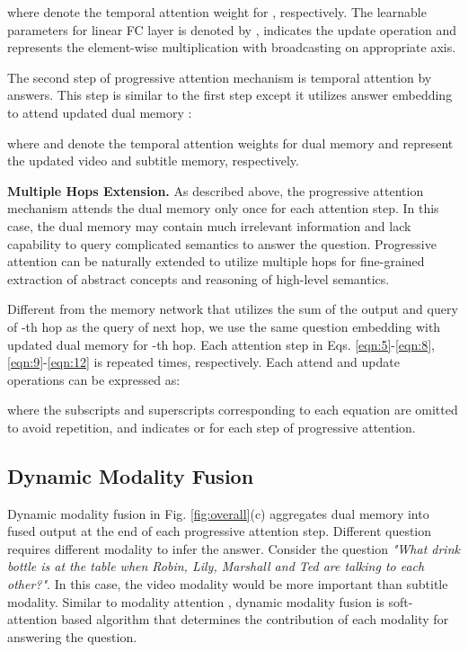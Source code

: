 \documentclass[10pt,twocolumn,letterpaper]{article}
\begin{document}
where  denote the temporal attention weight for , respectively. The learnable parameters for linear FC layer is denoted by  ,  indicates the update operation and  represents the element-wise multiplication with broadcasting on appropriate axis.


The second step of progressive attention mechanism is temporal attention by answers. This step is similar to the first step except it utilizes answer embedding  to attend updated dual memory :

where  and  denote the temporal attention weights for dual memory and  represent the updated video and subtitle memory, respectively.

\textbf{Multiple Hops Extension.}
As described above, the progressive attention mechanism attends the dual memory only once for each attention step. In this case, the dual memory may contain much irrelevant information and lack capability to query complicated semantics to answer the question. Progressive attention can be naturally extended to utilize multiple hops \cite{e2ememory} for fine-grained extraction of abstract concepts and reasoning of high-level semantics.

Different from the memory network \cite{e2ememory} that utilizes the sum of the output  and query  of -th hop as the query of next hop, we use the same question embedding  with updated dual memory  for -th hop. Each attention step in Eqs. \ref{eqn:5}-\ref{eqn:8}, \ref{eqn:9}-\ref{eqn:12} is repeated  times, respectively. Each attend and update operations can be expressed as:

where the subscripts and superscripts corresponding to each equation are omitted to avoid repetition, and  indicates  or  for each step of progressive attention. 


\subsection{Dynamic Modality Fusion}
Dynamic modality fusion in Fig. \ref{fig:overall}(c) aggregates dual memory into fused output  at the end of each progressive attention step. Different question requires different modality to infer the answer. Consider the question \textit{"What drink bottle is at the table when Robin, Lily, Marshall and Ted are talking to each other?"}. In this case, the video modality would be more important than subtitle modality. Similar to modality attention \cite{Hori_2017_ICCV,Kang_2018_ECCV}, dynamic modality fusion is soft-attention based algorithm that determines the contribution of each modality for answering the question. 
\end{document}
